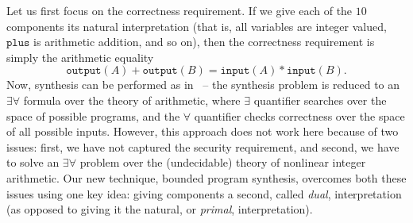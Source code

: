 \documentclass[preprint]{sig-alternate-05-2015}
\begin{document}
Let us first focus on the correctness requirement. If we give each of the $10$
components its natural interpretation (that is, all variables are 
integer valued, $\mathtt{plus}$ is arithmetic addition, and so on), 
then the correctness requirement is simply the arithmetic equality
$$\mathtt{output}(A) + \mathtt{output}(B) = \mathtt{input}(A)*\mathtt{input}(B).$$
Now, synthesis can be performed as in~\cite{bitvector} -- the synthesis problem
is reduced to an $\exists\forall$ formula over the theory of arithmetic,
where $\exists$ quantifier searches over the space of possible programs,
and the $\forall$ quantifier checks correctness over the space of all possible
inputs.  However, this approach does not work here because
of two issues: first, 
we have not captured the security requirement, and second,
we have to solve an $\exists\forall$ problem over 
the (undecidable) theory of nonlinear integer arithmetic.
Our new technique, bounded program synthesis, overcomes both these
issues using one key idea: giving components a second, called {\em{dual}},
interpretation (as opposed to giving it the natural, or {\em{primal}}, interpretation).

\newcommand{\ttrule}[4]{{{#1}}: & \begin{array}{c}{#2}\\ \hline {#3}\end{array} &  {{#4}}}
\newcommand{\hoare}[3]{{\{{#1}\}\; {#2}\; \{{#3}\}}}
\end{document}
